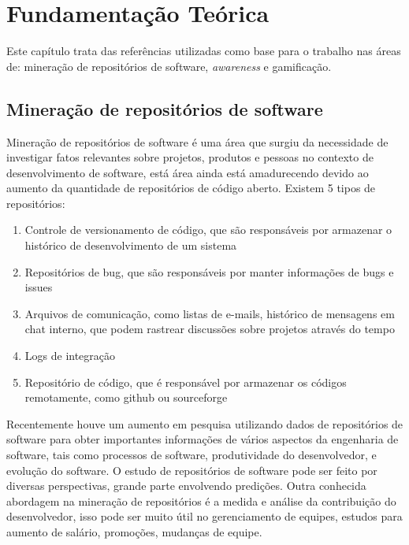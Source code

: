 \chapter[Fundamentação Teórica]{Fundamentação Teórica}
Este capítulo trata das referências utilizadas como base para o trabalho nas áreas de: mineração de repositórios de software, \textit{awareness} e gamificação.

\section{Mineração de repositórios de software} 
Mineração de repositórios de software é uma área que surgiu da necessidade de investigar fatos relevantes sobre projetos, produtos e pessoas no contexto de desenvolvimento de software, está área ainda está amadurecendo devido ao aumento da quantidade de repositórios de código aberto. 
    Existem 5 tipos de repositórios:
\begin{enumerate}
\item Controle de versionamento de código, que são responsáveis por armazenar o histórico de desenvolvimento de um sistema
\item Repositórios de bug, que são responsáveis por manter informações de bugs e issues 
\item Arquivos de comunicação, como listas de e-mails, histórico de mensagens em chat interno, que podem rastrear discussões sobre projetos através do tempo
\item Logs de integração 
\item Repositório de código, que é responsável por armazenar os códigos remotamente, como github ou sourceforge
\end{enumerate}
Recentemente houve um aumento em pesquisa utilizando dados de repositórios de software para obter importantes informações de vários aspectos da engenharia de software, tais como processos de software, produtividade do desenvolvedor, e evolução do software. O estudo de repositórios de software pode ser feito por diversas perspectivas, grande parte envolvendo predições. Outra conhecida abordagem na mineração de repositórios é a medida e análise da contribuição do desenvolvedor, isso pode ser muito útil no gerenciamento de equipes, estudos para aumento de salário, promoções, mudanças de equipe.
